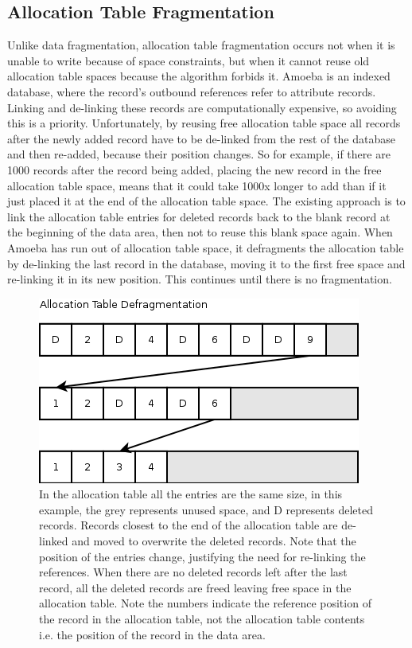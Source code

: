 \documentclass[11pt]{article}
\begin{document}
\subsection{Allocation Table Fragmentation}
Unlike data fragmentation, allocation table fragmentation occurs not when it is unable to write because of space constraints, but when it cannot reuse old allocation table spaces because the algorithm forbids it. Amoeba is an indexed database, where the record's outbound references refer to attribute records. Linking and de-linking these records are computationally expensive, so avoiding this is a priority. Unfortunately, by reusing free allocation table space all records after the newly added record have to be de-linked from the rest of the database and then re-added, because their position changes. So for example, if there are 1000 records after the record being added, placing the new record in the free allocation table space, means that it could take 1000x longer to add than if it just placed it at the end of the allocation table space.
\newline
\newline
The existing approach is to link the allocation table entries for deleted records back to the blank record at the beginning of the data area, then not to reuse this blank space again. When Amoeba has run out of allocation table space, it defragments the allocation table by de-linking the last record in the database, moving it to the first free space and re-linking it in its new position. This continues until there is no fragmentation.
\begin{figure}[ht]
\centering
\includegraphics[scale=0.5]{Fragmentation2.png}
\caption{In the allocation table all the entries are the same size, in this example, the grey represents unused space, and D represents deleted records. Records closest to the end of the allocation table are de-linked and moved to overwrite the deleted records. Note that the position of the entries change, justifying the need for re-linking the references. When there are no deleted records left after the last record, all the deleted records are freed leaving free space in the allocation table. Note the numbers indicate the reference position of the record in the allocation table, not the allocation table contents i.e. the position of the record in the data area.}
\end{figure}
\end{document}
